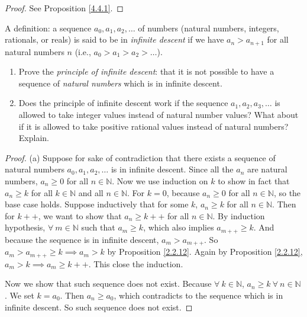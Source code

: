\begin{proof}
See Proposition \ref{4.4.1}.
\end{proof}

\begin{exercise}\label{ex 4.4.2}
A definition: a sequence \(a_0, a_1, a_2, \dots\) of numbers (natural numbers, integers, rationals, or reals) is said to be in \emph{infinite descent} if we have \(a_n > a_{n + 1}\) for all natural numbers \(n\)
(i.e., \(a_0 > a_1 > a_2 > \dots\)).
\begin{enumerate}
    \item Prove the \emph{principle of infinite descent}:
    that it is not possible to have a sequence of \emph{natural numbers} which is in infinite descent.
    \item Does the principle of infinite descent work if the sequence \(a_1, a_2, a_3, \dots\) is allowed to take integer values instead of natural number values?
    What about if it is allowed to take positive rational values instead of natural numbers?
    Explain.
\end{enumerate}
\end{exercise}

\begin{proof}{(a)}
Suppose for sake of contradiction that there exists a sequence of natural numbers \(a_0, a_1, a_2, \dots\) is in infinite descent.
Since all the \(a_n\) are natural numbers, \(a_n \geq 0\) for all \(n \in \mathds{N}\).
Now we use induction on \(k\) to show in fact that \(a_n \geq k\) for all \(k \in \mathds{N}\) and all \(n \in \mathds{N}\).
For \(k = 0\), because \(a_n \geq 0\) for all \(n \in \mathds{N}\), so the base case holds.
Suppose inductively that for some \(k\), \(a_n \geq k\) for all \(n \in \mathds{N}\).
Then for \(k++\), we want to show that \(a_n \geq k++\) for all \(n \in \mathds{N}\).
By induction hypothesis, \(\forall\ m \in \mathds{N}\) such that \(a_m \geq k\), which also implies \(a_{m++} \geq k\).
And because the sequence is in infinite descent, \(a_m > a_{m++}\).
So \(a_m > a_{m++} \geq k \implies a_m > k\) by Proposition \ref{2.2.12}.
Again by Proposition \ref{2.2.12}, \(a_m > k \implies a_m \geq k++\).
This close the induction.

Now we show that such sequence does not exist.
Because \(\forall\ k \in \mathds{N}\), \(a_n \geq k \ \forall\ n \in \mathds{N}\).
We set \(k = a_0\).
Then \(a_n \geq a_0\), which contradicts to the sequence which is in infinite descent.
So such sequence does not exist.
\end{proof}

